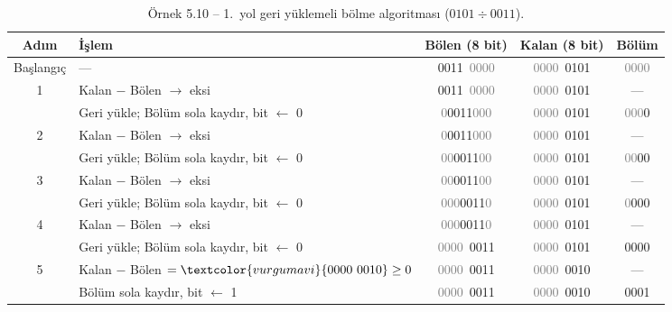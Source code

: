 \begin{ornek}[5.10]
\begin{table}[H]
\centering
\caption[Örnek 5.10 -- 1.\ yol geri yüklemeli bölme]{Örnek 5.10 -- 1.\ yol geri yüklemeli bölme algoritması ($0101 \div 0011$).}
\label{tab:bolme1-ornek}
\small
\begin{tabular}{c l c c c}
\toprule
\textbf{Adım} & \textbf{İşlem} & \textbf{\textcolor{vurgukirmizi}{Bölen} (8 bit)} & \textbf{\textcolor{vurgumavi}{Kalan} (8 bit)} & \textbf{\textcolor{vurguyesil}{Bölüm}} \\
\midrule
Başlangıç & --- & \textcolor{vurgukirmizi}{0011}\ \textcolor{gray}{0000} & \textcolor{gray}{0000}\ \textcolor{vurgumavi}{0101} & \textcolor{gray}{0000} \\
\midrule
1 & Kalan $-$ Bölen $\to$ eksi & \textcolor{vurgukirmizi}{0011}\ \textcolor{gray}{0000} & \textcolor{gray}{0000}\ \textcolor{vurgumavi}{0101} & --- \\
  & Geri yükle; Bölüm sola kaydır, bit $\leftarrow$ 0 & \textcolor{gray}{0}\textcolor{vurgukirmizi}{0011}\textcolor{gray}{000} & \textcolor{gray}{0000}\ \textcolor{vurgumavi}{0101} & \textcolor{gray}{000}\textcolor{vurguyesil}{0} \\
\midrule
2 & Kalan $-$ Bölen $\to$ eksi & \textcolor{gray}{0}\textcolor{vurgukirmizi}{0011}\textcolor{gray}{000} & \textcolor{gray}{0000}\ \textcolor{vurgumavi}{0101} & --- \\
  & Geri yükle; Bölüm sola kaydır, bit $\leftarrow$ 0 & \textcolor{gray}{00}\textcolor{vurgukirmizi}{0011}\textcolor{gray}{00} & \textcolor{gray}{0000}\ \textcolor{vurgumavi}{0101} & \textcolor{gray}{00}\textcolor{vurguyesil}{00} \\
\midrule
3 & Kalan $-$ Bölen $\to$ eksi & \textcolor{gray}{00}\textcolor{vurgukirmizi}{0011}\textcolor{gray}{00} & \textcolor{gray}{0000}\ \textcolor{vurgumavi}{0101} & --- \\
  & Geri yükle; Bölüm sola kaydır, bit $\leftarrow$ 0 & \textcolor{gray}{000}\textcolor{vurgukirmizi}{0011}\textcolor{gray}{0} & \textcolor{gray}{0000}\ \textcolor{vurgumavi}{0101} & \textcolor{gray}{0}\textcolor{vurguyesil}{000} \\
\midrule
4 & Kalan $-$ Bölen $\to$ eksi & \textcolor{gray}{000}\textcolor{vurgukirmizi}{0011}\textcolor{gray}{0} & \textcolor{gray}{0000}\ \textcolor{vurgumavi}{0101} & --- \\
  & Geri yükle; Bölüm sola kaydır, bit $\leftarrow$ 0 & \textcolor{gray}{0000}\ \textcolor{vurgukirmizi}{0011} & \textcolor{gray}{0000}\ \textcolor{vurgumavi}{0101} & \textcolor{vurguyesil}{0000} \\
\midrule
5 & Kalan $-$ Bölen $= \textcolor{vurgumavi}{0000\ 0010} \geq 0$ & \textcolor{gray}{0000}\ \textcolor{vurgukirmizi}{0011} & \textcolor{gray}{0000}\ \textcolor{vurgumavi}{0010} & --- \\
  & Bölüm sola kaydır, bit $\leftarrow$ 1 & \textcolor{gray}{0000}\ \textcolor{vurgukirmizi}{0011} & \textcolor{gray}{0000}\ \textcolor{vurgumavi}{0010} & \textcolor{vurguyesil}{0001} \\
\bottomrule
\end{tabular}
\end{table}


\end{ornek}

